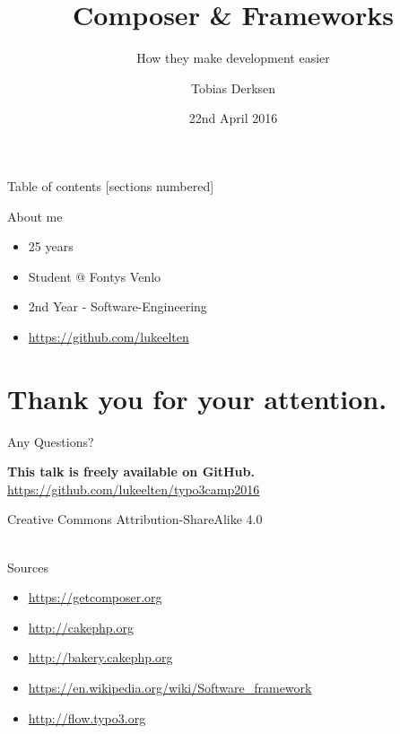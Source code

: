 \documentclass{beamer}
\title{Composer \& Frameworks}
\subtitle{How they make development easier}
\date{22nd April 2016}
\author{Tobias Derksen}
\institute{Fontys School of Technology \& Logistics}
\begin{document}
  \maketitle

  \begin{frame}{Table of contents}
    [sections numbered]
    \tableofcontents[hideallsubsections]
  \end{frame}


  \begin{frame}{About me}
  	\begin{itemize}
  		\item 25 years
  		\item Student @ Fontys Venlo
  		\item 2nd Year - Software-Engineering
  		\item \url{https://github.com/lukeelten}
  	\end{itemize}
  \end{frame}

  
  
  

	\section*{Thank you for your attention.}
	\begin{frame}[standout]
		Any Questions?
	\end{frame}
	
	\appendix
	
	\begin{frame}{}
		\textbf{This talk is freely available on GitHub.} \\
		\url{https://github.com/lukeelten/typo3camp2016}
		\vfill
		\begin{center}
			Creative Commons Attribution-ShareAlike 4.0 ~\\~\\
			\ccbysa
		\end{center}
	\end{frame}
	
	\begin{frame}{Sources}
		\begin{itemize}
			\item \url{https://getcomposer.org}
			\item \url{http://cakephp.org}
			\item \url{http://bakery.cakephp.org}
			\item \url{https://en.wikipedia.org/wiki/Software_framework}
			\item \url{http://flow.typo3.org}
		\end{itemize}
	\end{frame}
\end{document}
